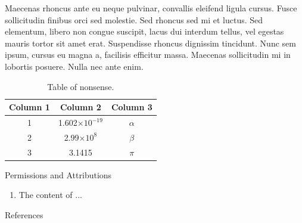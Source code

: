 Maecenas rhoncus ante eu neque pulvinar, convallis eleifend ligula cursus. Fusce sollicitudin finibus orci sed molestie. Sed rhoncus sed mi et luctus. Sed elementum, libero non congue suscipit, lacus dui interdum tellus, vel egestas mauris tortor sit amet erat. Suspendisse rhoncus dignissim tincidunt. Nunc sem ipsum, cursus eu magna a, facilisis efficitur massa. Maecenas sollicitudin mi in lobortis posuere. Nulla nec ante enim.

\begin{table}[]
    \begin{center}
    \caption{Table of nonsense.}
    \label{tab:label}
    \begin{tabular}{c c c}
        \textbf{Column 1} & \textbf{Column 2} & \textbf{Column 3}\\
        \hline
        1 & 1.602$\times 10^{-19}$ & $\alpha$ \\
        2 & 2.99$\times 10^{8}$ & $\beta$ \\
        3 & 3.1415 & $\pi$ \\
        \hline
    \end{tabular}
    \end{center}
\end{table}


\begin{section}{Permissions and Attributions}
\begin{enumerate}
\item The content of ...
\end{enumerate}
\end{section}

\begin{section}{References}
    
\end{section}
